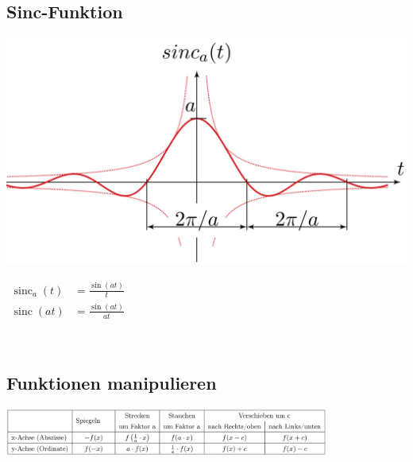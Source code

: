 	\subsection{Sinc-Funktion}
				\begin{minipage}{0.2\textwidth}
			\includegraphics[width=\textwidth]{./bilder/funktionen/sincF.png}
		\end{minipage}
		\qquad
		\begin{minipage}{0.45\textwidth}
			\begin{math}
				\begin{aligned}
					\operatorname{sinc}_{a}(t) &= \frac{\sin (a t)}{t} \\
					\operatorname{sinc}(a t) &= \frac{\sin (a t)}{a t}
				 \end{aligned}
			 \end{math}
		\end{minipage}
		\qquad
		\begin{minipage}{0.25\textwidth}						
		\end{minipage}\\
	
		
	
	
	\subsection{Funktionen manipulieren}
		\includegraphics[width=0.8\textwidth]{./bilder/SignalManip.png}